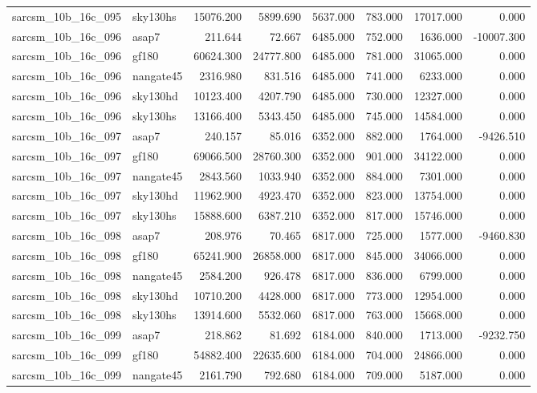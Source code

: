 \begin{tabular}{llrrrrrr}
sarcsm\_10b\_16c\_095 & sky130hs & 15076.200 & 5899.690 & 5637.000 & 783.000 & 17017.000 & 0.000 \\
sarcsm\_10b\_16c\_096 & asap7 & 211.644 & 72.667 & 6485.000 & 752.000 & 1636.000 & -10007.300 \\
sarcsm\_10b\_16c\_096 & gf180 & 60624.300 & 24777.800 & 6485.000 & 781.000 & 31065.000 & 0.000 \\
sarcsm\_10b\_16c\_096 & nangate45 & 2316.980 & 831.516 & 6485.000 & 741.000 & 6233.000 & 0.000 \\
sarcsm\_10b\_16c\_096 & sky130hd & 10123.400 & 4207.790 & 6485.000 & 730.000 & 12327.000 & 0.000 \\
sarcsm\_10b\_16c\_096 & sky130hs & 13166.400 & 5343.450 & 6485.000 & 745.000 & 14584.000 & 0.000 \\
sarcsm\_10b\_16c\_097 & asap7 & 240.157 & 85.016 & 6352.000 & 882.000 & 1764.000 & -9426.510 \\
sarcsm\_10b\_16c\_097 & gf180 & 69066.500 & 28760.300 & 6352.000 & 901.000 & 34122.000 & 0.000 \\
sarcsm\_10b\_16c\_097 & nangate45 & 2843.560 & 1033.940 & 6352.000 & 884.000 & 7301.000 & 0.000 \\
sarcsm\_10b\_16c\_097 & sky130hd & 11962.900 & 4923.470 & 6352.000 & 823.000 & 13754.000 & 0.000 \\
sarcsm\_10b\_16c\_097 & sky130hs & 15888.600 & 6387.210 & 6352.000 & 817.000 & 15746.000 & 0.000 \\
sarcsm\_10b\_16c\_098 & asap7 & 208.976 & 70.465 & 6817.000 & 725.000 & 1577.000 & -9460.830 \\
sarcsm\_10b\_16c\_098 & gf180 & 65241.900 & 26858.000 & 6817.000 & 845.000 & 34066.000 & 0.000 \\
sarcsm\_10b\_16c\_098 & nangate45 & 2584.200 & 926.478 & 6817.000 & 836.000 & 6799.000 & 0.000 \\
sarcsm\_10b\_16c\_098 & sky130hd & 10710.200 & 4428.000 & 6817.000 & 773.000 & 12954.000 & 0.000 \\
sarcsm\_10b\_16c\_098 & sky130hs & 13914.600 & 5532.060 & 6817.000 & 763.000 & 15668.000 & 0.000 \\
sarcsm\_10b\_16c\_099 & asap7 & 218.862 & 81.692 & 6184.000 & 840.000 & 1713.000 & -9232.750 \\
sarcsm\_10b\_16c\_099 & gf180 & 54882.400 & 22635.600 & 6184.000 & 704.000 & 24866.000 & 0.000 \\
sarcsm\_10b\_16c\_099 & nangate45 & 2161.790 & 792.680 & 6184.000 & 709.000 & 5187.000 & 0.000 \\

\end{tabular}
